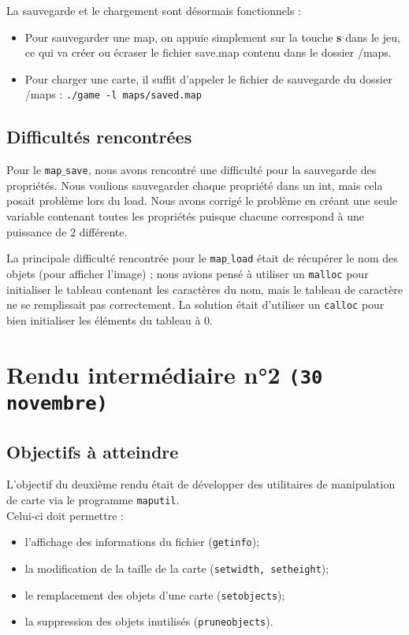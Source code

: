 \documentclass[a4paper, 12pt]{article}
\begin{document}
La sauvegarde et le chargement sont désormais fonctionnels :
\begin{itemize}
	\item Pour sauvegarder une map, on appuie simplement sur la touche \textbf{s} dans le jeu, ce qui va créer ou écraser le fichier save.map contenu dans le dossier /maps.

	\item Pour charger une carte, il suffit d'appeler le fichier de sauvegarde du dossier /maps : \texttt{./game -l maps/saved.map}
\end{itemize}


	\subsection{Difficultés rencontrées}
	Pour le \texttt{map$\_$save}, nous avons rencontré une difficulté pour la sauvegarde des propriétés. Nous voulions sauvegarder chaque propriété dans un int, mais cela posait problème lors du load. Nous avons corrigé le problème en créant une seule variable contenant toutes les propriétés puisque chacune correspond à une puissance de 2 différente.
	
	La principale difficulté rencontrée pour le \texttt{map$\_$load} était de récupérer le nom des objets (pour afficher l'image) ; nous avions pensé à utiliser un \texttt{malloc} pour initialiser le tableau contenant les caractères du nom, mais le tableau de caractère ne se remplissait pas correctement. La solution était d'utiliser un \texttt{calloc} pour bien initialiser les éléments du tableau à 0. 
	
\newpage
\section{Rendu intermédiaire n°2 \texttt{(30 novembre)}}
	\subsection{Objectifs à atteindre}
	
	L'objectif du deuxième rendu était de développer des utilitaires de manipulation de carte via le programme \texttt{maputil}. \\
	Celui-ci doit permettre :
	\begin{itemize}
		\item l'affichage des informations du fichier (\texttt{getinfo});
		\item la modification de la taille de la carte (\texttt{setwidth, setheight});
		\item le remplacement des objets d'une carte (\texttt{setobjects});
		\item la suppression des objets inutilisés (\texttt{pruneobjects}). \\
	\end{itemize}
\end{document}
